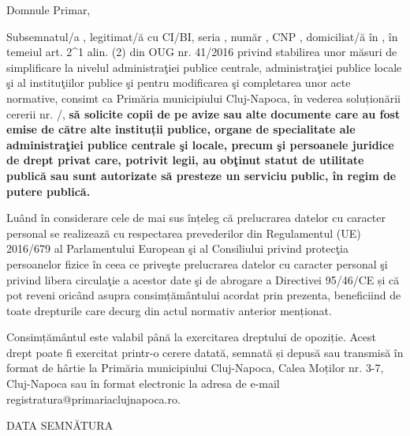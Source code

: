 \documentclass[11pt,a4paper]{article}
\newcommand{\fillline}[1][6cm]{\underline{\hspace{#1}}}
\begin{document}
\begin{center}
{\large Domnule Primar,}
\end{center}

\vspace{1cm}

Subsemnatul/a \fillline[8cm], legitimat/ă cu CI/BI, seria \fillline[1.5cm], număr \fillline[3cm], CNP \fillline[5cm], domiciliat/ă în \fillline[14cm] \fillline[16cm], în temeiul art. 2\textasciicircum{}1 alin. (2) din OUG nr. 41/2016 privind stabilirea unor măsuri de simplificare la nivelul administraţiei publice centrale, administraţiei publice locale şi al instituţiilor publice şi pentru modificarea şi completarea unor acte normative, consimt ca Primăria municipiului Cluj-Napoca, în vederea soluționării cererii nr. \fillline[3cm]/\fillline[2.5cm], \textbf{să solicite copii de pe avize sau alte documente care au fost emise de către alte instituții publice, organe de specialitate ale administraţiei publice centrale şi locale, precum şi persoanele juridice de drept privat care, potrivit legii, au obţinut statut de utilitate publică sau sunt autorizate să presteze un serviciu public, în regim de putere publică.}

\vspace{0.5cm}

Luând în considerare cele de mai sus înțeleg că prelucrarea datelor cu caracter personal se realizează cu respectarea prevederilor din Regulamentul (UE) 2016/679 al Parlamentului European şi al Consiliului privind protecţia persoanelor fizice în ceea ce priveşte prelucrarea datelor cu caracter personal şi privind libera circulaţie a acestor date şi de abrogare a Directivei 95/46/CE și că pot reveni oricând asupra consimțământului acordat prin prezenta, beneficiind de toate drepturile care decurg din actul normativ anterior menționat.

\vspace{0.5cm}

Consimțământul este valabil până la exercitarea dreptului de opoziție. Acest drept poate fi exercitat printr-o cerere datată, semnată și depusă sau transmisă în format de hârtie la Primăria municipiului Cluj-Napoca, Calea Moților nr. 3-7, Cluj-Napoca sau în format electronic la adresa de e-mail registratura@primariaclujnapoca.ro.

\vspace{3cm}

DATA \fillline[5cm] \hfill SEMNĂTURA \fillline[5cm]
\end{document}
